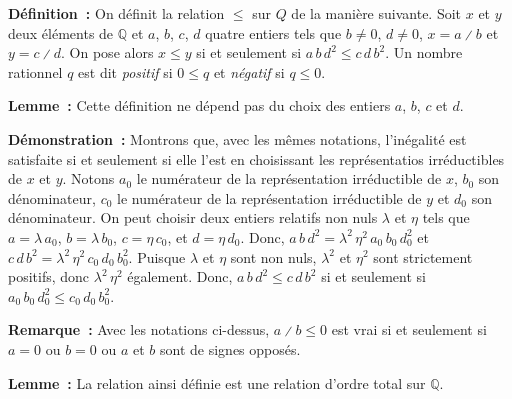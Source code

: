 \noindent\textbf{Définition :} On définit la relation $\leq$ sur $Q$ de la manière suivante. 
    Soit $x$ et $y$ deux éléments de $\mathbb{Q}$ et $a$, $b$, $c$, $d$ quatre entiers tels que $b \neq 0$, $d \neq 0$, $x = a \divslash b$ et $y = c \divslash d$.
    On pose alors $x \leq y$ si et seulement si $a \, b \, d^2 \leq c \, d \, b^2$.
    Un nombre rationnel $q$ est dit \emph{positif} si $0 \leq q$ et \emph{négatif} si $q \leq 0$.

\medskip

\noindent\textbf{Lemme :} Cette définition ne dépend pas du choix des entiers $a$, $b$, $c$ et $d$.

\medskip

\noindent\textbf{Démonstration :} 
    Montrons que, avec les mêmes notations, l'inégalité est satisfaite si et seulement si elle l'est en choisissant les représentatios irréductibles de $x$ et $y$.
    Notons $a_0$ le numérateur de la représentation irréductible de $x$, $b_0$ son dénominateur, $c_0$ le numérateur de la représentation irréductible de $y$ et $d_0$ son dénominateur.
    On peut choisir deux entiers relatifs non nuls $\lambda$ et $\eta$ tels que $a = \lambda \, a_0$, $b = \lambda \, b_0$, $c = \eta \, c_0$, et $d = \eta \, d_0$.
    Donc, $a \, b \, d^2 = \lambda^2 \, \eta^2 \, a_0 \, b_0 \, d_0^2$ et $c \, d \, b^2 = \lambda^2 \, \eta^2 \, c_0 \, d_0 \, b_0^2$.
    Puisque $\lambda$ et $\eta$ sont non nuls, $\lambda^2$ et $\eta^2$ sont strictement positifs, donc $\lambda^2 \, \eta^2$ également.
    Donc, $a \, b \, d^2 \leq c \, d \, b^2$ si et seulement si $a_0 \, b_0 \, d_0^2 \leq c_0 \, d_0 \, b_0^2$.
    
    \done

\medskip

\noindent\textbf{Remarque :} Avec les notations ci-dessus, $a \divslash b \leq 0$ est vrai si et seulement si $a = 0$ ou $b = 0$ ou $a$ et $b$ sont de signes opposés.

\medskip

\noindent\textbf{Lemme :} La relation ainsi définie est une relation d'ordre total sur $\mathbb{Q}$.

\medskip

